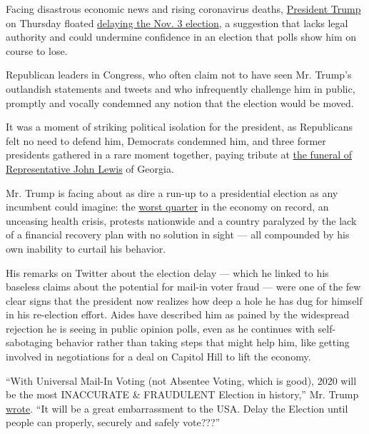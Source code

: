 Facing disastrous economic news and rising coronavirus deaths,
\href{https://www.nytimes3xbfgragh.onion/interactive/2020/us/elections/donald-trump.html}{President
Trump} on Thursday floated
\href{https://www.nytimes3xbfgragh.onion/2020/08/04/podcasts/the-daily/mail-in-voting-president-trump.html?action=click\&module=Briefings\&pgtype=Homepage}{delaying
the Nov. 3 election}, a suggestion that lacks legal authority and could
undermine confidence in an election that polls show him on course to
lose.

Republican leaders in Congress, who often claim not to have seen Mr.
Trump's outlandish statements and tweets and who infrequently challenge
him in public, promptly and vocally condemned any notion that the
election would be moved.

It was a moment of striking political isolation for the president, as
Republicans felt no need to defend him, Democrats condemned him, and
three former presidents gathered in a rare moment together, paying
tribute at
\href{https://www.nytimes3xbfgragh.onion/2020/07/30/us/john-lewis-live-funeral.html}{the
funeral of Representative John Lewis} of Georgia.

Mr. Trump is facing about as dire a run-up to a presidential election as
any incumbent could imagine: the
\href{https://www.nytimes3xbfgragh.onion/live/2020/07/30/business/stock-market-today-coronavirus}{worst
quarter} in the economy on record, an unceasing health crisis, protests
nationwide and a country paralyzed by the lack of a financial recovery
plan with no solution in sight --- all compounded by his own inability
to curtail his behavior.

His remarks on Twitter about the election delay --- which he linked to
his baseless claims about the potential for mail-in voter fraud --- were
one of the few clear signs that the president now realizes how deep a
hole he has dug for himself in his re-election effort. Aides have
described him as pained by the widespread rejection he is seeing in
public opinion polls, even as he continues with self-sabotaging behavior
rather than taking steps that might help him, like getting involved in
negotiations for a deal on Capitol Hill to lift the economy.

``With Universal Mail-In Voting (not Absentee Voting, which is good),
2020 will be the most INACCURATE \& FRAUDULENT Election in history,''
Mr. Trump
\href{https://twitter.com/realDonaldTrump/status/1288818160389558273?s=20}{wrote}.
``It will be a great embarrassment to the USA. Delay the Election until
people can properly, securely and safely vote???''

